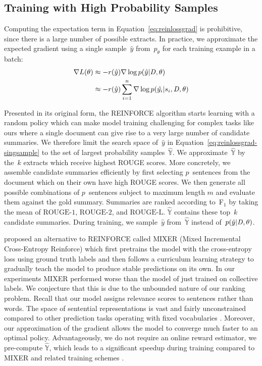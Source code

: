 \documentclass[11pt,a4paper]{article}
\newcommand\doc{{\it D }}
\begin{document}
\subsection{Training with High Probability Samples}

Computing the expectation term in Equation~\eqref{eq:reinlossgrad} is
prohibitive, since there is a large number of possible extracts. In
practice, we approximate the expected gradient using a single
sample~$\hat{y}$ from~$p_{\theta}$ for each training example in a
batch:
\begin{align}
  \nabla L(\theta) &\approx -r(\hat{y}) \nabla \log
  p(\hat{y} | \doc,\theta) \\ &\approx - r(\hat{y}) \sum_{i=1}^n \nabla
  \log p(\hat{y_i} | s_i,\doc,\theta) \label{eq:reinlossgrad-singsample}
\end{align}


Presented in its original form, the REINFORCE algorithm starts
learning with a random policy which can make model training
challenging for complex tasks like ours where a single document can
give rise to a very large number of candidate summaries. We therefore
limit the search space of~$\hat{y}$ in
Equation~\eqref{eq:reinlossgrad-singsample} to the set of largest
probability samples~$\hat{\mathbb{Y}}$. We
approximate~$\hat{\mathbb{Y}}$ by the~$k$ extracts which receive
highest ROUGE scores. More concretely, we assemble candidate summaries
efficiently by first selecting $p$~sentences from the document which
on their own have high ROUGE scores. We then generate all possible
combinations of $p$~sentences subject to maximum length $m$ and
evaluate them against the gold summary. Summaries are ranked according
to~F$_1$ by taking the mean of $\mbox{ROUGE-1}$, $\mbox{ROUGE-2}$, and
$\mbox{ROUGE-L}$. $\hat{\mathbb{Y}}$ contains these top~$k$ candidate
summaries.  During training, we sample~$\hat{y}$
from~$\hat{\mathbb{Y}}$ instead of~$p(\hat{y} | \doc,\theta)$.

 proposed an alternative to REINFORCE
called MIXER (Mixed Incremental Cross-Entropy Reinforce) which first
pretrains the model with the cross-entropy loss using ground truth
labels and then follows a curriculum learning strategy
\cite{bengio-nips2015-curriculum} to gradually teach the model to
produce stable predictions on its own. In our experiments MIXER
performed worse than the model of  just trained
on collective labels. We conjecture that this is due to the unbounded
nature of our ranking problem. Recall that our model assigns relevance
scores to sentences rather than words. The space of sentential
representations is vast and fairly unconstrained compared to other
prediction tasks operating with fixed vocabularies
\cite{li-emnlp-16,paulus-socher-arxiv17,xingxing-arxiv-17}.  Moreover,
our approximation of the gradient allows the model to converge much
faster to an optimal policy. Advantageously, we do not require an
online reward estimator, we pre-compute $\hat{\mathbb{Y}}$, which
leads to a significant speedup during training compared to MIXER
\cite{ranzato-arxiv15-bias} and related training schemes
\cite{shenMRT-acl16}.
\end{document}
